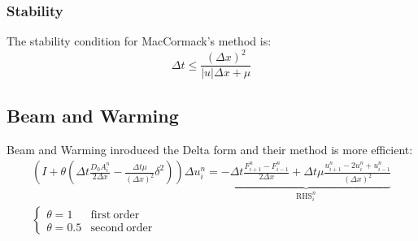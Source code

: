 \documentclass[11pt, a4paper]{article}
\begin{document}
\subsubsection{Stability}
The stability condition for MacCormack's method is:
\begin{equation}
    \Delta t\le\frac{\left(\Delta x\right)^2}{\left|u\right|\Delta x+\mu}
\end{equation}

\subsection{Beam and Warming}
Beam and Warming inroduced the Delta form and their method is more efficient:
\begin{equation}
    \begin{array}{c}
        \displaystyle\left(I+\theta\left(\Delta t\frac{D_0A_i^n}{2\Delta x}-\frac{\Delta t\mu}{\left(\Delta x\right)^2}\delta^2\right)\right)\Delta u_i^n=\underbrace{-\Delta t\frac{F_{i+1}^n-F_{i-1}^n}{2\Delta x}+\Delta t\mu\frac{u^n_{i+1}-2u^n_i+u^n_{i-1}}{\left(\Delta x\right)^2}}_{\displaystyle\mathrm{RHS}_i^n} \\
        \left\{\begin{array}{ll}
            \theta=1 & \mathrm{first\ order} \\
            \theta=0.5 & \mathrm{second\ order}
        \end{array}\right.
    \end{array}
\end{equation}
\end{document}
